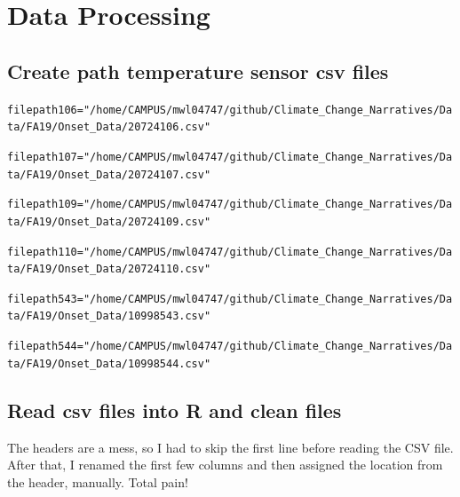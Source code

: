 \documentclass{article}\usepackage[]{graphicx}\usepackage[]{color}
\makeatletter
\newcommand{\hlstr}[1]{\textcolor[rgb]{0.192,0.494,0.8}{#1}}%
\newcommand{\hlstd}[1]{\textcolor[rgb]{0.345,0.345,0.345}{#1}}%
\newcommand{\hlkwb}[1]{\textcolor[rgb]{0.69,0.353,0.396}{#1}}%
\newenvironment{kframe}{%
 \def\at@end@of@kframe{}%
 \ifinner\ifhmode%
  \def\at@end@of@kframe{\end{minipage}}%
  \begin{minipage}{\columnwidth}%
 \fi\fi%
 \def\FrameCommand##1{\hskip\@totalleftmargin \hskip-\fboxsep
 \colorbox{shadecolor}{##1}\hskip-\fboxsep
     \hskip-\linewidth \hskip-\@totalleftmargin \hskip\columnwidth}%
 \MakeFramed {\advance\hsize-\width
   \@totalleftmargin\z@ \linewidth\hsize
   \@setminipage}}%
 {\par\unskip\endMakeFramed%
 \at@end@of@kframe}
\newenvironment{knitrout}{}{} %
\makeatother
\begin{document}
\section{Data Processing}

\subsection{Create path temperature sensor csv files}

\begin{knitrout}
\color{fgcolor}\begin{kframe}
\begin{alltt}
\hlstd{filepath106} \hlkwb{=} \hlstr{"/home/CAMPUS/mwl04747/github/Climate_Change_Narratives/Data/FA19/Onset_Data/20724106.csv"}

\hlstd{filepath107} \hlkwb{=} \hlstr{"/home/CAMPUS/mwl04747/github/Climate_Change_Narratives/Data/FA19/Onset_Data/20724107.csv"}

\hlstd{filepath109} \hlkwb{=} \hlstr{"/home/CAMPUS/mwl04747/github/Climate_Change_Narratives/Data/FA19/Onset_Data/20724109.csv"}

\hlstd{filepath110} \hlkwb{=} \hlstr{"/home/CAMPUS/mwl04747/github/Climate_Change_Narratives/Data/FA19/Onset_Data/20724110.csv"}

\hlstd{filepath543} \hlkwb{=} \hlstr{"/home/CAMPUS/mwl04747/github/Climate_Change_Narratives/Data/FA19/Onset_Data/10998543.csv"}

\hlstd{filepath544} \hlkwb{=} \hlstr{"/home/CAMPUS/mwl04747/github/Climate_Change_Narratives/Data/FA19/Onset_Data/10998544.csv"}
\end{alltt}
\end{kframe}
\end{knitrout}

\subsection{Read csv files into R and clean files}

The headers are a mess, so I had to skip the first line before reading the CSV file. After that, I renamed the first few columns and then assigned the location from the header, manually. Total pain!
\end{document}

